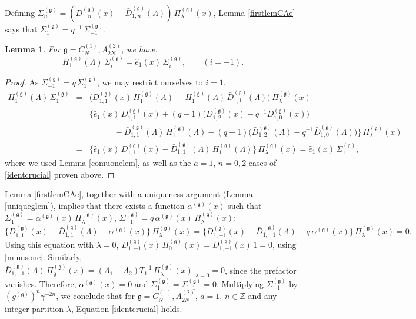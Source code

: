 \documentclass[12pt]{amsart}
\newtheorem{lemma}[thm]{Lemma}
\newcommand{\barD}{\bar D}
\newcommand{\g}{{\mathfrak{g}}}
\newcommand{\Z}{{\mathbb Z}}
\newcommand{\al}{{\alpha}}
\newcommand{\lL}{{\Lambda}}
\numberwithin{equation}{section}
\begin{document}
Defining $\Sigma_n^{(\g)} =(D_{1,n}^{(\g)}(x)-\barD_{1,n}^{(\g)}(\lL))\,\Pi_\lambda^{(\g)}(x)$, Lemma \ref{firstlemCAe} says that
$\Sigma_1^{(\g)}=q^{-1}\,\Sigma_{-1}^{(\g)}$.
\begin{lemma}\label{seclemCAe}
For $\g=C_N^{(1)},A_{2N}^{(2)}$, we have:
$$H_1^{(\g)}(\lL)\, \Sigma_i^{(\g)}= {\hat e}_1(x) \, \Sigma_i^{(\g)}, \qquad (i=\pm 1). $$
\end{lemma}
\begin{proof}
As $\Sigma_{-1}^{(\g)}=q\, \Sigma_1^{(\g)}$, we may restrict ourselves to $i=1$.
\begin{eqnarray}
H_1^{(\g)}(\lL)\, \Sigma_1^{(\g)}&=&\Big( D_{1,1}^{(\g)}(x)\,H_1^{(\g)}(\lL)\, -H_1^{(\g)}(\lL)\,\barD_{1,1}^{(\g)}(\lL)\Big)\,\Pi_\lambda^{(\g)}(x)\nonumber \\
%
&=&\Big\{ {\hat e}_1(x)\,D_{1,1}^{(\g)}(x)+(q-1) \big(D_{1,2}^{(\g)}(x)-q^{-1}D_{1,0}^{(\g)}(x)\big)  \nonumber \\
&&\qquad \quad -\barD_{1,1}^{(\g)}(\lL)\,H_1^{(\g)}(\lL) -(q-1)\big(\barD_{1,2}^{(\g)}(\lL)-q^{-1}\barD_{1,0}^{(\g)}(\lL)\big) \Big\}\,\Pi_\lambda^{(\g)}(x)\nonumber \\
&=& \Big\{ {\hat e}_1(x)\,D_{1,1}^{(\g)}(x) -\barD_{1,1}^{(\g)}(\lL)\,H_1^{(\g)}(\lL)\Big\}\,\Pi_\lambda^{(\g)}(x)={\hat e}_1(x) \,\Sigma_1^{(\g)}, \label{tobecont}
\end{eqnarray}
where we used Lemma \ref{comuonelem},  as well as the $a=1$, $n=0,2$ cases of 
\eqref{identcrucial} proven above.
\end{proof}
Lemma \ref{firstlemCAe}, together with a uniqueness argument (Lemma \ref{uniqueglem}), implies that
there exists a function $\al^{(\g)}(x)$ 
such that $\Sigma_1^{(\g)}=\al^{(\g)}(x) \,\Pi_\lambda^{(\g)}(x)$, $\Sigma_{-1}^{(\g)}=q\,\al^{(\g)}(x) \,\Pi_\lambda^{(\g)}(x)$:
%
%
%
$$\{ D_{1,1}^{(\g)}(x)-{\barD}_{1,1}^{(\g)}(\lL)-\al^{(\g)}(x)\}\,\Pi_\lambda^{(\g)}(x)=\{ D_{1,-1}^{(\g)}(x)-\barD_{1,-1}^{(\g)}(\lL)-q\,\al^{(\g)}(x)\}\,\Pi_\lambda^{(\g)}(x)=0.$$
Using this equation with $\lambda=0$, 
 $D_{1,-1}^{(\g)}(x)\, \Pi_0^{(\g)}(x)=D_{1,-1}^{(\g)}(x)\, 1=0$, using  \eqref{minusone}.
Similarly,
$\barD_{1,-1}^{(\g)}(\lL)\,\Pi_\emptyset^{(\g)}(x)=(\lL_1-\lL_2)T_1^{-1}\, \Pi_\lambda^{(\g)}(x)\vert_{\lambda=0}=0$, since the prefactor vanishes. 
Therefore, $\al^{(\g)}(x)=0$ and $\Sigma_1^{(\g)}=\Sigma_{-1}^{(\g)}=0$. 
Multiplying $\Sigma_{-1}^{(\g)}$ by $(g^{(\g)})^n \gamma^{-2 n}$, we conclude that for $\g=C_N^{(1)},A_{2N}^{(2)}$, $a=1$, $n\in \Z$ and any integer partition $\lambda$, Equation \eqref{identcrucial} holds.
%
%
%
%
%
\end{document}
